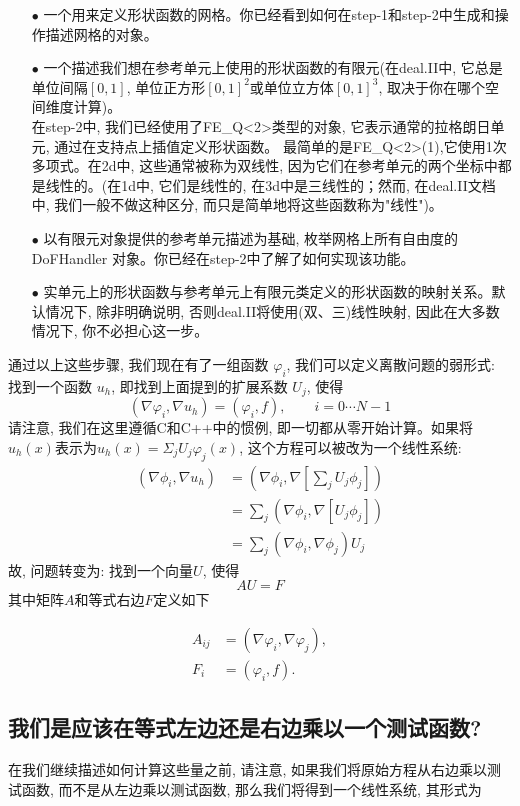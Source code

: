 \documentclass[12pt, a4paper, oneside]{ctexart}
\begin{document}
\begin{itemize}
    \item[$\bullet$]一个用来定义形状函数的网格。你已经看到如何在step-1和step-2中生成和操作描述网格的对象。
    \item[$\bullet$]一个描述我们想在参考单元上使用的形状函数的有限元(在deal.II中, 它总是单位间隔$[0,1]$, 单位正方形$[0,1]^2$或单位立方体$[0,1]^3$, 取决于你在哪个空间维度计算)。 \\
    在step-2中, 我们已经使用了FE\_Q<2>类型的对象,     它表示通常的拉格朗日单元, 通过在支持点上插值定义形状函数。    最简单的是FE\_Q<2>(1),它使用1次多项式。在2d中, 这些通常被称为双线性, 因为它们在参考单元的两个坐标中都是线性的。(在1d中, 它们是线性的, 在3d中是三线性的；然而, 在deal.II文档中, 我们一般不做这种区分, 而只是简单地将这些函数称为"线性")。
    \item[$\bullet$]以有限元对象提供的参考单元描述为基础, 枚举网格上所有自由度的 DoFHandler 对象。你已经在step-2中了解了如何实现该功能。
    \item[$\bullet$] 实单元上的形状函数与参考单元上有限元类定义的形状函数的映射关系。默认情况下, 除非明确说明, 否则deal.II将使用(双、三)线性映射, 因此在大多数情况下, 你不必担心这一步。


\end{itemize}
通过以上这些步骤, 我们现在有了一组函数 $\varphi_i$, 我们可以定义离散问题的弱形式: 找到一个函数 $u_h$, 即找到上面提到的扩展系数 $U_j$, 使得
$$(\nabla \varphi_i,\nabla u_h)=(\varphi_i,f),\qquad i=0\cdots N-1$$
请注意, 我们在这里遵循C和C++中的惯例, 即一切都从零开始计算。如果将$ u_h(x)$表示为$u_h(x)=\Sigma_jU_j\varphi_j(x)$, 这个方程可以被改为一个线性系统: 
$$\begin{aligned}
    \left(\nabla \phi_i, \nabla u_h\right) & =\left(\nabla \phi_i, \nabla\left[\sum_j U_j \phi_j\right]\right) \\
    & =\sum_j\left(\nabla \phi_i, \nabla\left[U_j \phi_j\right]\right) \\
    & =\sum_j\left(\nabla \phi_i, \nabla \phi_j\right) U_j
    \end{aligned}$$
故, 问题转变为: 找到一个向量$U$, 使得
$$AU=F$$
其中矩阵$A$和等式右边$F$定义如下

$$\begin{aligned}
    A_{i j} & =\left(\nabla \varphi_i, \nabla \varphi_j\right), \\
    F_i & =\left(\varphi_i, f\right) .
    \end{aligned}$$
\subsection{我们是应该在等式左边还是右边乘以一个测试函数?}
在我们继续描述如何计算这些量之前, 请注意, 如果我们将原始方程从右边乘以测试函数, 而不是从左边乘以测试函数, 那么我们将得到一个线性系统, 其形式为
\end{document}

